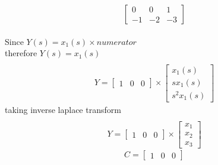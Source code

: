 \begin{enumerate}[label=\thesection.\arabic*.,ref=\thesection.\theenumi]
\begin{equation*}
\begin{bmatrix}
0&0&1\\
-1&-2&-3
\end{bmatrix}
\end{equation*}
\\
Since $ Y(s)=x_{1}(s)\times numerator$
\\therefore $ Y(s)=x_{1}(s) $
\begin{gather*}
\\Y=
\begin{bmatrix}
1&0&0
\end{bmatrix}\times \begin{bmatrix}
x_{1}(s)\\
sx_{1}(s)\\
s^2x_{1}(s)
\end{bmatrix} 
\end{gather*}
taking inverse laplace transform
\begin{gather*}
\\Y=
\begin{bmatrix}
1&0&0
\end{bmatrix}\times \begin{bmatrix}
x_{1}\\
x_{2}\\
x_{3}
\end{bmatrix} 
\end{gather*}
\begin{equation*}
C=\begin{bmatrix}
1&0&0
\end{bmatrix}
\end{equation*}
%

%
\end{enumerate}

